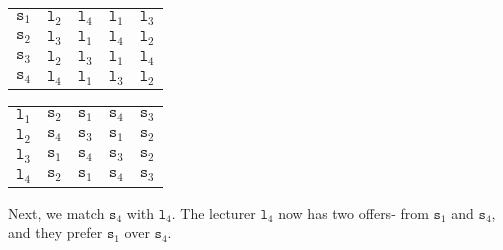 \documentclass[a4paper, openany]{memoir}
\begin{document}
    \begin{table}[H]
        \centering
        \begin{subtable}{0.45\textwidth}
            \centering
            \begin{tabular}{c|cccc}
                $\texttt{s}_1$ & {\color{gray} $\texttt{l}_2$} & \underline{$\texttt{l}_4$} & $\texttt{l}_1$ & $\texttt{l}_3$ \\
                $\texttt{s}_2$ & \underline{$\texttt{l}_3$} & $\texttt{l}_1$ & $\texttt{l}_4$ & $\texttt{l}_2$ \\
                $\texttt{s}_3$ & \underline{$\texttt{l}_2$} & $\texttt{l}_3$ & $\texttt{l}_1$ & $\texttt{l}_4$ \\
                $\texttt{s}_4$ & \underline{$\texttt{l}_4$} & $\texttt{l}_1$ & $\texttt{l}_3$ & $\texttt{l}_2$
            \end{tabular}
        \end{subtable}
        \hfill
        \begin{subtable}{0.45\textwidth}
            \centering
            \begin{tabular}{c|cccc}
                $\texttt{l}_1$ & $\texttt{s}_2$ & $\texttt{s}_1$ & $\texttt{s}_4$ & $\texttt{s}_3$ \\
                $\texttt{l}_2$ & $\texttt{s}_4$ & \underline{$\texttt{s}_3$} & $\texttt{s}_1$ & $\texttt{s}_2$ \\
                $\texttt{l}_3$ & $\texttt{s}_1$ & $\texttt{s}_4$ & $\texttt{s}_3$ & \underline{$\texttt{s}_2$} \\
                $\texttt{l}_4$ & $\texttt{s}_2$ & \underline{$\texttt{s}_1$} & \underline{$\texttt{s}_4$} & $\texttt{s}_3$
            \end{tabular}
        \end{subtable}
    \end{table}
    \noindent Next, we match $\texttt{s}_4$ with $\texttt{l}_4$. The lecturer $\texttt{l}_4$ now has two offers- from $\texttt{s}_1$ and $\texttt{s}_4$, and they prefer $\texttt{s}_1$ over $\texttt{s}_4$. 
\end{document}
